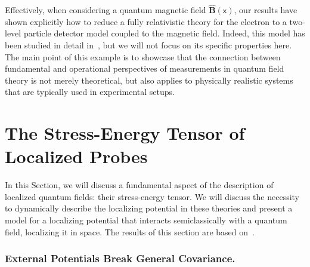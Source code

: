 \documentclass[letterpaper,12pt,titlepage,oneside,final]{book}
\newcommand{\mf}{\mathsf}%
\begin{document}
Effectively, when considering a quantum magnetic field $\hat{\bm B}(\mf x)$, our results have shown explicitly how to reduce a fully relativistic theory for the electron to a two-level particle detector model coupled to the magnetic field. Indeed, this model has been studied in detail in~\cite{ruhi}, but we will not focus on its specific properties here. The main point of this example is to showcase that the connection between fundamental and operational perspectives of measurements in quantum field theory is not merely theoretical, but also applies to physically realistic systems that are typically used in experimental setups.


\section{The Stress-Energy Tensor of Localized Probes}\label{sec:Tmunu}

In this Section, we will discuss a fundamental aspect of the description of localized quantum fields: their stress-energy tensor. We will discuss the necessity to dynamically describe the localizing potential in these theories and present a model for a localizing potential that interacts semiclassically with a quantum field, localizing it in space. The results of this section are based on~\cite{TmunuUDW}.


\subsubsection*{External Potentials Break General Covariance.}
\end{document}
